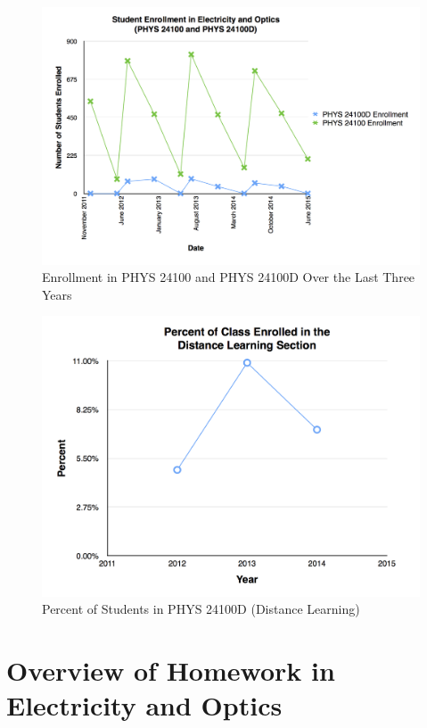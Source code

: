 \begin{figure}[!hb]
	\centering
	\includegraphics[width=5in]{img/chapter1/enrollment}
	\caption[Enrollment in PHYS 24100 and PHYS 24100D Over the Last Three Years]{Enrollment in PHYS 24100 and PHYS 24100D Over the Last Three Years}
	\label{fig:enrollment}
\end{figure}


\begin{figure}[!hb]
	\centering
	\includegraphics[width=5in]{img/chapter1/percent}
	\caption[Percent of Students in PHYS 24100D (Distance Learning)]{Percent of Students in PHYS 24100D (Distance Learning)}
	\label{fig:percent}
\end{figure}

\section{Overview of Homework in Electricity and Optics}

